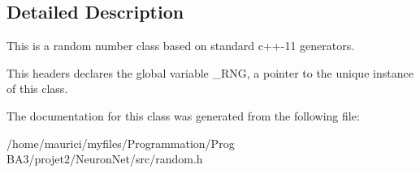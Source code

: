 \subsection{Detailed Description}
This is a random number class based on standard c++-\/11 generators.

This headers declares the global variable \+\_\+\+R\+NG, a pointer to the unique instance of this class. 

The documentation for this class was generated from the following file\+:\begin{DoxyCompactItemize}
\item 
/home/maurici/myfiles/\+Programmation/\+Prog B\+A3/projet2/\+Neuron\+Net/src/random.\+h\end{DoxyCompactItemize}
